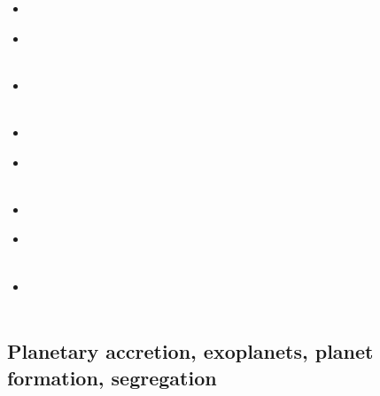 \begin{scriptsize}
\begin{itemize}
\item[\nineteenninetyfour] 
\textcite{begl94b} \\
\item[\nineteenninetyfive] 
\textcite{belg95a} \\
\textcite{belg95b} \\
\item[\nineteenninetysix] 
\textcite{bekf96} \\
\textcite{como96} \\
\item[\nineteenninetyseven] 
\textcite{bekk97} \\
\item[\nineteenninetyeight] 
\textcite{pobe98} \\
\textcite{zhat98} \\
\item[\twothousandthree]
\textcite{hans03} \\
\item[\twothousandfour]
\textcite{katf04} \\
\textcite{huvv04} \\
\item[\twothousandten]
\textcite{yiha10} \\
\textcite{libe10} \\
\end{itemize}
\end{scriptsize}

\subsection{Planetary accretion, exoplanets, planet formation, segregation}


